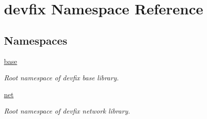 \hypertarget{namespacedevfix}{}\section{devfix Namespace Reference}
\label{namespacedevfix}
\subsection*{Namespaces}
\begin{DoxyCompactItemize}
\item 
 \hyperlink{namespacedevfix_1_1base}{base}
\begin{DoxyCompactList}\small\item\em Root namespace of devfix base library. \end{DoxyCompactList}\item 
 \hyperlink{namespacedevfix_1_1net}{net}
\begin{DoxyCompactList}\small\item\em Root namespace of devfix network library. \end{DoxyCompactList}\end{DoxyCompactItemize}
